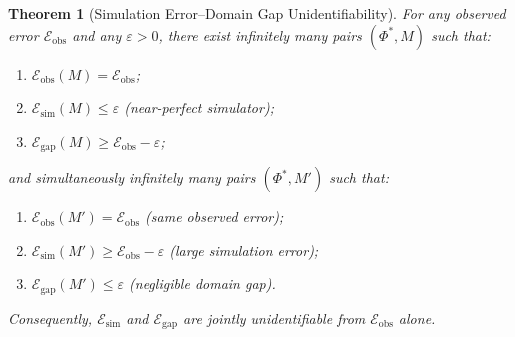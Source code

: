 \documentclass[11pt,twocolumn]{article}
\newtheorem{theorem}{Theorem}[section]
\theoremstyle{definition}
\begin{document}
\begin{theorem}[Simulation Error--Domain Gap Unidentifiability]
\label{thm:unident}
For any observed error $\mathcal{E}_{\text{obs}}$ and any $\varepsilon > 0$,
there exist \emph{infinitely many} pairs $(\Phi^*, M)$ such that:
\begin{enumerate}[label=(\roman*),nosep]
  \item $\mathcal{E}_{\text{obs}}(M) = \mathcal{E}_{\text{obs}}$;
  \item $\mathcal{E}_{\text{sim}}(M) \le \varepsilon$ (near-perfect simulator);
  \item $\mathcal{E}_{\text{gap}}(M) \ge \mathcal{E}_{\text{obs}} - \varepsilon$;
\end{enumerate}
and simultaneously infinitely many pairs $(\Phi^*, M')$ such that:
\begin{enumerate}[label=(\roman*),nosep]
  \item $\mathcal{E}_{\text{obs}}(M') = \mathcal{E}_{\text{obs}}$ (same observed error);
  \item $\mathcal{E}_{\text{sim}}(M') \ge \mathcal{E}_{\text{obs}} - \varepsilon$ (large simulation error);
  \item $\mathcal{E}_{\text{gap}}(M') \le \varepsilon$ (negligible domain gap).
\end{enumerate}

Consequently, $\mathcal{E}_{\text{sim}}$ and $\mathcal{E}_{\text{gap}}$ are
\emph{jointly unidentifiable} from $\mathcal{E}_{\text{obs}}$ alone.
\end{theorem}
\end{document}
